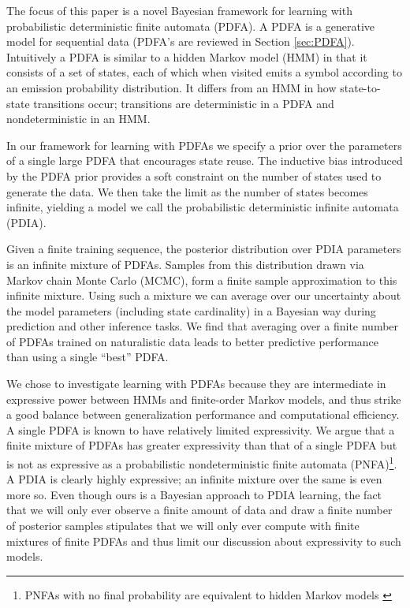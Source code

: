 The focus of this paper is a novel Bayesian framework for learning with probabilistic deterministic finite automata (PDFA).  A PDFA is a generative model for sequential data (PDFA's are reviewed in  Section \ref{sec:PDFA}).  Intuitively a PDFA is similar to a hidden Markov model (HMM) in that it consists of a set of states, each of which when visited emits a symbol according to an emission probability distribution.  It differs from an HMM in how state-to-state transitions occur; transitions are deterministic in a PDFA and nondeterministic in an HMM.  

In our framework for learning with PDFAs we specify a prior over the parameters of a single large PDFA that encourages state reuse.  The inductive bias introduced by the PDFA prior provides a soft constraint on the number of states used to generate the data.  We then take the limit as the number of states becomes infinite, yielding a model we call the probabilistic deterministic infinite automata (PDIA).  

Given a finite training sequence, the posterior distribution over PDIA parameters is an infinite mixture of PDFAs.  Samples from this distribution drawn via Markov chain Monte Carlo (MCMC), form a finite sample approximation to this infinite mixture.  Using such a mixture we can average over our uncertainty about the model parameters (including state cardinality) in a Bayesian way during prediction and other inference tasks.  We find that averaging over a finite number of PDFAs trained on naturalistic data leads to better predictive performance than using a single ``best'' PDFA.  

We chose to investigate learning with PDFAs because they are intermediate in expressive power between HMMs and finite-order Markov models, and thus strike a good balance between generalization performance and computational efficiency.  A single PDFA is known to have relatively limited expressivity.  We argue that a finite mixture of PDFAs has greater expressivity than that of a single PDFA but is not as expressive as a probabilistic nondeterministic finite automata (PNFA)\footnote{PNFAs with no final probability are equivalent to hidden Markov models \cite{Dupont2005} \label{fn:pnfa}}.  A PDIA is clearly highly expressive; an infinite mixture over the same is even more so.  Even though ours is a Bayesian approach to PDIA learning, the fact that we will only ever observe a finite amount of data and draw a finite number of posterior samples stipulates that we will only ever compute with finite mixtures of finite PDFAs and thus limit our discussion about expressivity to such models.   


